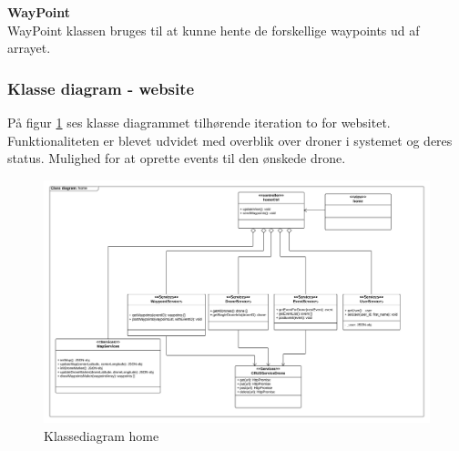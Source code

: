 \textbf{WayPoint} \\
WayPoint klassen bruges til at kunne hente de forskellige waypoints ud af arrayet.  


\subsubsection*{Klasse diagram - website}
\vspace{-0.1cm}
På figur \ref{fig:classDiagram_home} ses klasse diagrammet tilhørende iteration to for websitet. Funktionaliteten er blevet udvidet med overblik over droner i systemet og deres status. Mulighed for at oprette events til den ønskede drone. 
\begin{figure}[H]
	\centering
	\includegraphics[width=1.1\textwidth]{Billeder/klasse_diagrammer/home_class_diagram.png}
	\vspace{-0.5cm}
	\caption{Klassediagram home}
	\label{fig:classDiagram_home}
\end{figure}
